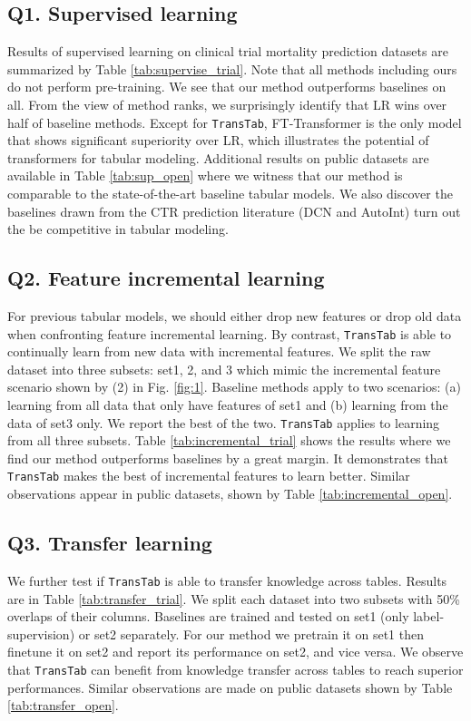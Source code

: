 \subsection{Q1. Supervised learning} Results of supervised learning on clinical trial mortality prediction datasets are summarized by Table \ref{tab:supervise_trial}.  Note that all methods including ours do not perform pre-training. We see that our method outperforms baselines on all. From the view of method ranks, we surprisingly identify that LR wins over half of baseline methods. Except for \texttt{TransTab}, FT-Transformer is the only model that shows significant superiority over LR, which illustrates the potential of transformers for tabular modeling.  Additional results on public datasets are available in Table \ref{tab:sup_open} where we witness that our method is comparable to the state-of-the-art baseline tabular models.  We also discover the baselines drawn from the CTR prediction literature (DCN and AutoInt) turn out the be competitive in tabular modeling. 

\subsection{Q2. Feature incremental learning} \label{sec:fil}
For previous tabular models, we should either drop new features or drop old data when confronting feature incremental learning. By contrast, \texttt{TransTab} is able to continually learn from new data with incremental features. We split the raw dataset into three subsets: set1, 2, and 3 which mimic the incremental feature scenario shown by (2) in Fig. \ref{fig:1}. Baseline methods apply to two scenarios: (a) learning from all data that only have features of set1 and (b) learning from the data of set3 only. We report the best of the two. \texttt{TransTab} applies to learning from all three subsets. Table \ref{tab:incremental_trial} shows the results where we find our method outperforms baselines by a great margin. It demonstrates that \texttt{TransTab} makes the best of incremental features to learn better. Similar observations appear in public datasets, shown by Table \ref{tab:incremental_open}.

\subsection{Q3. Transfer learning}\label{sec:tl}
We further test if \texttt{TransTab} is able to transfer knowledge across tables. Results are in Table \ref{tab:transfer_trial}. We split each dataset into two subsets with 50\% overlaps of their columns. Baselines are trained and tested on set1 (only label-supervision) or set2 separately. For our method we pretrain it on set1 then finetune it on set2 and report its performance on set2, and vice versa. We observe that \texttt{TransTab} can benefit from knowledge transfer across tables to reach superior performances. Similar observations are made on public datasets shown by Table \ref{tab:transfer_open}.

